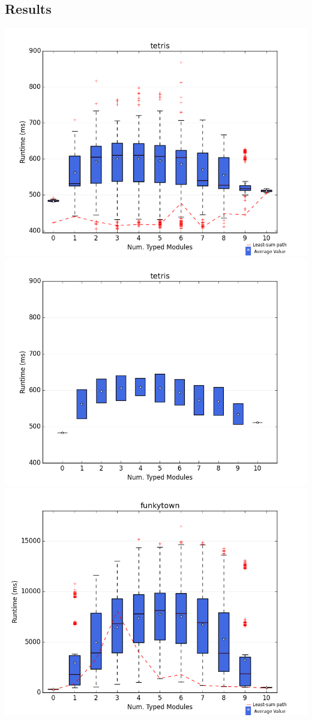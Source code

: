 \documentclass{article}
\begin{document}
\subsection{Results}
\includegraphics[width=\textwidth]{boxplots/tetris-boxplot.png}
\includegraphics[width=\textwidth]{sampling/tetris-sampling-10.png}
\newpage
\includegraphics[width=\textwidth]{boxplots/funkytown-boxplot.png}
\end{document}
